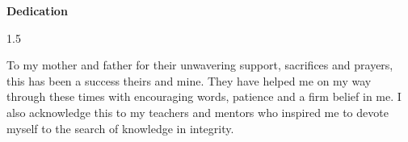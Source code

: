
\newpage
\thispagestyle{empty}

\begin{center}
\textbf{\LARGE Dedication}
\end{center}

\vspace{1cm}

\begin{spacing}{1.5}

To my mother and father for their unwavering support, sacrifices and prayers, this has been a success theirs and mine. They have helped me on my way through these times with encouraging words, patience and a firm belief in me.
I also acknowledge this to my teachers and mentors who inspired me to devote myself to the search of knowledge in integrity.

\end{spacing}

\newpage
